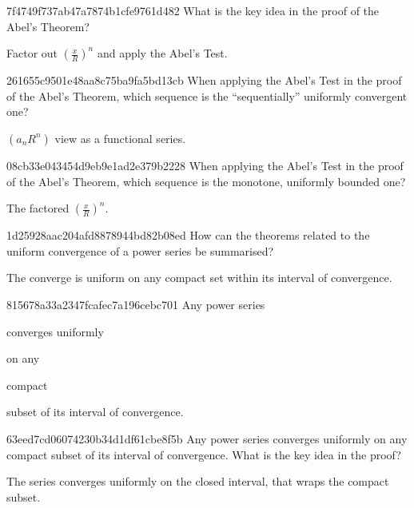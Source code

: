 \begin{note}{7f4749f737ab47a7874b1cfe9761d482}
    What is the key idea in the proof of the Abel's Theorem?

    \begin{cloze}{1}
        Factor out \({ \left( \frac{x}{R} \right)^{n} }\) and apply the Abel's Test.
    \end{cloze}
\end{note}

\begin{note}{261655c9501e48aa8c75ba9fa5bd13cb}
    When applying the Abel's Test in the proof of the Abel's Theorem, which sequence is the ``sequentially'' uniformly convergent one?

    \begin{cloze}{1}
        \({ \left( a_n R^{n} \right) }\) view as a functional series.
    \end{cloze}
\end{note}

\begin{note}{08cb33e043454d9eb9e1ad2e379b2228}
    When applying the Abel's Test in the proof of the Abel's Theorem, which sequence is the monotone, uniformly bounded one?

    \begin{cloze}{1}
        The factored \({ \left( \frac{x}{R} \right)^{n} }\).
    \end{cloze}
\end{note}

\begin{note}{1d25928aac204afd8878944bd82b08ed}
    How can the theorems related to the uniform convergence of a power series be summarised?

    \begin{cloze}{1}
        The converge is uniform on any compact set within its interval of convergence.
    \end{cloze}
\end{note}

\begin{note}{815678a33a2347fcafec7a196cebc701}
    Any power series \begin{icloze}{1}converges uniformly\end{icloze} on any \begin{icloze}{2}compact\end{icloze} subset of its interval of convergence.
\end{note}

\begin{note}{63eed7cd06074230b34d1df61cbe8f5b}
    Any power series converges uniformly on any compact subset of its interval of convergence.
    What is the key idea in the proof?

    \begin{cloze}{1}
        The series converges uniformly on the closed interval, that wraps the compact subset.
    \end{cloze}
\end{note}

